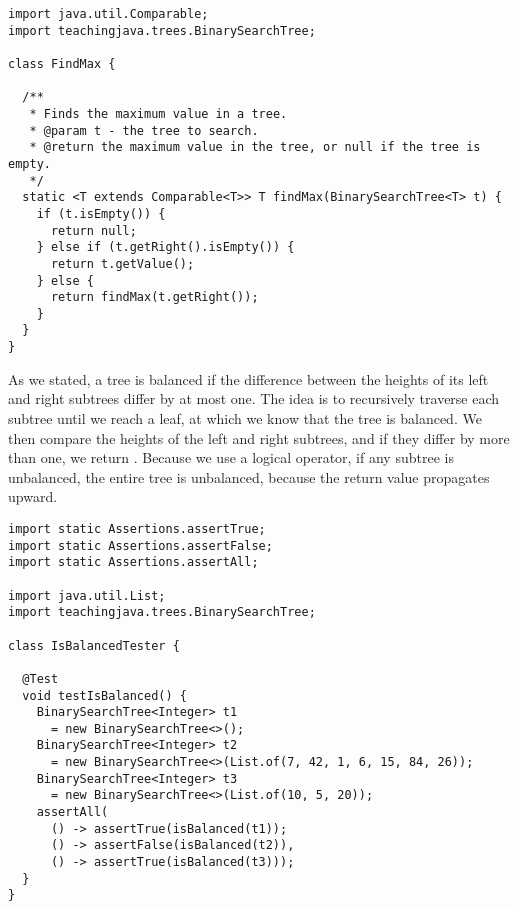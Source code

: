 \begin{lstlisting}[language=MyJava]
import java.util.Comparable;
import teachingjava.trees.BinarySearchTree;

class FindMax {

  /**
   * Finds the maximum value in a tree.
   * @param t - the tree to search.
   * @return the maximum value in the tree, or null if the tree is empty.
   */
  static <T extends Comparable<T>> T findMax(BinarySearchTree<T> t) {
    if (t.isEmpty()) {
      return null;
    } else if (t.getRight().isEmpty()) {
      return t.getValue();
    } else {
      return findMax(t.getRight());
    }
  }
}
\end{lstlisting}

 As we stated, a tree is balanced if the difference between the heights of its left and right subtrees differ by at most one. The idea is to recursively traverse each subtree until we reach a leaf, at which we know that the tree is balanced. We then compare the heights of the left and right subtrees, and if they differ by more than one, we return . Because we use a logical  operator, if any subtree is unbalanced, the entire tree is unbalanced, because the  return value propagates upward.

\begin{lstlisting}[language=MyJava]
import static Assertions.assertTrue;
import static Assertions.assertFalse;
import static Assertions.assertAll;

import java.util.List;
import teachingjava.trees.BinarySearchTree;

class IsBalancedTester {

  @Test
  void testIsBalanced() {
    BinarySearchTree<Integer> t1 
      = new BinarySearchTree<>();
    BinarySearchTree<Integer> t2 
      = new BinarySearchTree<>(List.of(7, 42, 1, 6, 15, 84, 26));
    BinarySearchTree<Integer> t3 
      = new BinarySearchTree<>(List.of(10, 5, 20));
    assertAll(
      () -> assertTrue(isBalanced(t1));
      () -> assertFalse(isBalanced(t2)),
      () -> assertTrue(isBalanced(t3)));
  }
}
\end{lstlisting}

